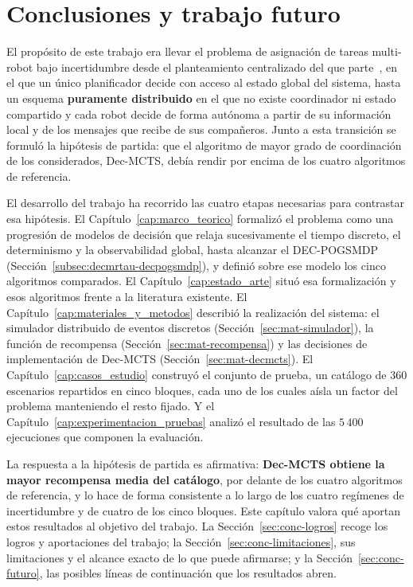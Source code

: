 \chapter{Conclusiones y trabajo futuro}\label{cap:conclusiones_trabajo_futuros}

El propósito de este trabajo era llevar el problema de asignación de tareas multi-robot bajo incertidumbre desde el planteamiento centralizado del que parte~, en el que un único planificador decide con acceso al estado global del sistema, hasta un esquema \textbf{puramente distribuido} en el que no existe coordinador ni estado compartido y cada robot decide de forma autónoma a partir de su información local y de los mensajes que recibe de sus compañeros. Junto a esta transición se formuló la hipótesis de partida: que el algoritmo de mayor grado de coordinación de los considerados, Dec-MCTS, debía rendir por encima de los cuatro algoritmos de referencia.

El desarrollo del trabajo ha recorrido las cuatro etapas necesarias para contrastar esa hipótesis. El Capítulo~\ref{cap:marco_teorico} formalizó el problema como una progresión de modelos de decisión que relaja sucesivamente el tiempo discreto, el determinismo y la observabilidad global, hasta alcanzar el DEC-POGSMDP (Sección~\ref{subsec:decmrtau-decpogsmdp}), y definió sobre ese modelo los cinco algoritmos comparados. El Capítulo~\ref{cap:estado_arte} situó esa formalización y esos algoritmos frente a la literatura existente. El Capítulo~\ref{cap:materiales_y_metodos} describió la realización del sistema: el simulador distribuido de eventos discretos (Sección~\ref{sec:mat-simulador}), la función de recompensa (Sección~\ref{sec:mat-recompensa}) y las decisiones de implementación de Dec-MCTS (Sección~\ref{sec:mat-decmcts}). El Capítulo~\ref{cap:casos_estudio} construyó el conjunto de prueba, un catálogo de $360$ escenarios repartidos en cinco bloques, cada uno de los cuales aísla un factor del problema manteniendo el resto fijado. Y el Capítulo~\ref{cap:experimentacion_pruebas} analizó el resultado de las $5\,400$ ejecuciones que componen la evaluación.

La respuesta a la hipótesis de partida es afirmativa: \textbf{Dec-MCTS obtiene la mayor recompensa media del catálogo}, por delante de los cuatro algoritmos de referencia, y lo hace de forma consistente a lo largo de los cuatro regímenes de incertidumbre y de cuatro de los cinco bloques. Este capítulo valora qué
aportan estos resultados al objetivo del trabajo. La Sección~\ref{sec:conc-logros} recoge los logros y aportaciones del trabajo; la Sección~\ref{sec:conc-limitaciones}, sus limitaciones y el alcance exacto de lo que puede afirmarse; y la Sección~\ref{sec:conc-futuro}, las posibles líneas de continuación que los resultados abren.

